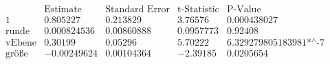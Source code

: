 \[\begin{array}{l|llll}
 \text{} & \text{Estimate} & \text{Standard Error} & \text{t-Statistic} & \text{P-Value} \\
\hline
 1 & 0.805227 & 0.213829 & 3.76576 & 0.000438027 \\
 \text{runde} & 0.000824536 & 0.00860888 & 0.0957773 & 0.92408 \\
 \text{vEbene} & 0.30199 & 0.05296 & 5.70222 & \text{6.329279805183981$\grave{ }$*${}^{\wedge}$-7} \\
 \text{gr{\" o}{\ss}e} & -0.00249624 & 0.00104364 & -2.39185 & 0.0205654 \\
\end{array}\]

